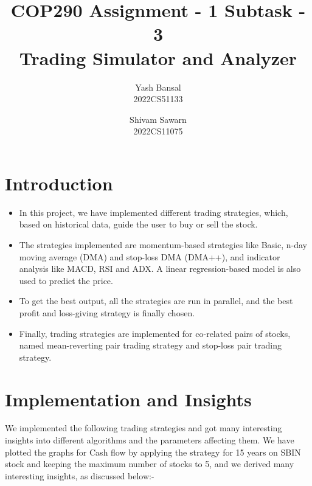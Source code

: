 \documentclass[11pt]{article}
\title{{\fontsize{21pt}{18pt}\selectfont COP290 Assignment - 1 Subtask - 3} \\ Trading Simulator and Analyzer}
\author{Yash Bansal \\ 2022CS51133 \and Shivam Sawarn \\ 2022CS11075}
\date{}
\begin{document}
\maketitle

\section{Introduction}

\begin{itemize}
    \item In this project, we have implemented different trading strategies, which, based on historical data, guide the user to buy or sell the stock.
    \item The strategies implemented are momentum-based strategies like Basic, n-day moving average (DMA) and stop-loss DMA (DMA++), and indicator analysis like MACD, RSI and ADX. A linear regression-based model is also used to predict the price.
    \item To get the best output, all the strategies are run in parallel, and the best profit and loss-giving strategy is finally chosen.
    \item Finally, trading strategies are implemented for co-related pairs of stocks, named mean-reverting pair trading strategy and stop-loss pair trading strategy.
\end{itemize}

\section{Implementation and Insights}
We implemented the following trading strategies and got many interesting insights into different algorithms and the parameters affecting them. We have plotted the graphs for Cash flow by applying the strategy for 15 years on SBIN stock and keeping the maximum number of stocks to 5, and we derived many interesting insights, as discussed below:- 
\end{document}
